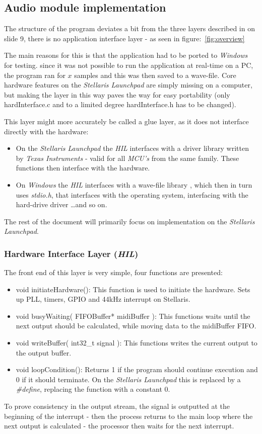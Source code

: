\subsection{Audio module implementation}

The structure of the program deviates a bit from the three layers described in
\cite{Lect2} on slide 9, there is no application interface layer - as seen in
figure:~\ref{fig:overview}


The main reasons for this is that the application had to be ported to
\emph{Windows} for testing.
since it was not possible to run the application at real-time on a PC, the
program ran for $x$ samples and this was then saved to a wave-file.
Core hardware features on the \emph{Stellaris Launchpad} are simply missing on a
computer, but making the layer in this way paves the way for easy portability (only
hardInterface.c and to a limited degree hardInterface.h has to be changed).

This layer might more accurately be called a glue layer, as it does not
interface directly with the hardware:
\begin{itemize}
  \item On the \emph{Stellaris Launchpad} the \emph{HIL} interfaces with a
  driver library written by \emph{Texas Instruments} - valid for all
  \emph{MCU's} from the same family. These functions then interface with the
  hardware.
  \item On \emph{Windows} the \emph{HIL} interfaces with a wave-file library
  \cite{writewav}, which then in turn uses \emph{stdio.h}, that interfaces with
  the operating system, interfacing with the hard-drive driver \ldots and so
  on.
\end{itemize}

The rest of the document will primarily focus on implementation on the
\emph{Stellaris Launchpad}.

\subsubsection{Hardware Interface Layer (\emph{HIL})}
The front end of this layer is very simple, four functions are presented:
\begin{itemize}
  \item void initiateHardware(): This function is used to initiate the hardware.
  Sets up PLL, timers, GPIO and 44kHz interrupt on Stellaris.
  \item void busyWaiting( FIFOBuffer* midiBuffer ): This functions waits until
  the next output should be calculated, while moving data to the midiBuffer
  FIFO.
  \item void writeBuffer( int32\_t signal ): This functions writes the current
  output to the output buffer.
  \item void loopCondition(): Returns 1 if the program should continue execution
  and 0 if it should terminate. On the \emph{Stellaris Launchpad} this is
  replaced by a \emph{\#define}, replacing the function with a constant 0.
\end{itemize}

To prove consistency in the output stream, the signal is outputted at the
beginning of the interrupt - then the process returns to the main loop where the
next output is calculated - the processor then waits for the next interrupt.

\subsubsecton
